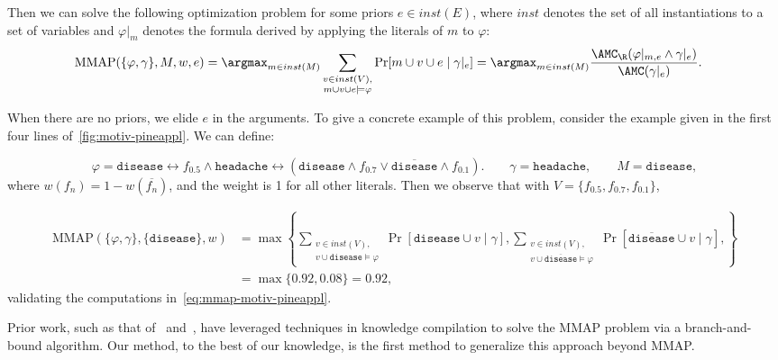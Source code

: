 Then we can solve the following optimization problem for some priors $e \in inst(E)$,
where $inst$ denotes the set of all instantiations to a set of variables and $\varphi|_m$
denotes the formula derived by applying the literals of $m$ to $\varphi$:
{\footnotesize
\begin{align}\label{eq:bbir-mmap}
  \mathrm{MMAP}{(\{\varphi, \gamma\}, M, w, e)}
  &= \argmax_{m \in inst(M)} \sum_{\substack{v \in inst(V), \\ m \cup v \cup e \models \varphi}}
  \Pr[m \cup v \cup e \mid \gamma|_e]
  = \argmax_{m \in inst(M)} \frac{\AMC_\R(\varphi|_{m,e} \land \gamma|_e)}{\AMC(\gamma|_e)}.
\end{align}
}

When there are no priors, we elide $e$ in the arguments.
To give a concrete example of this problem, consider the example
given in the first four lines of~\cref{fig:motiv-pineappl}.
We can define:

{\footnotesize
\begin{equation*}
  \varphi =  \texttt{disease} \leftrightarrow f_{0.5} \land
  \texttt{headache} \leftrightarrow (\texttt{disease} \land f_{0.7} \lor \overline{\texttt{disease}} \land f_{0.1}).
  \qquad
  \gamma = \texttt{headache},
  \qquad
  M = \texttt{disease},
\end{equation*}
}
where $w(f_{n}) = 1 - w(\overline{f_{n}})$,
and the weight is 1 for all other literals.
\noindent Then we observe that with $V = \{f_{0.5}, f_{0.7}, f_{0.1}\}$,

{\footnotesize
\begin{align*}
  \mathrm{MMAP}{(\{\varphi, \gamma\}, \{\texttt{disease}\},w)}
  &=\max \left\{
    \sum_{\substack{v \in inst(V), \\
    v \cup \texttt{disease} \models \varphi}} \Pr\left[\texttt{disease} \cup v \mid \gamma\right],
    \sum_{\substack{v \in inst(V), \\
    v \cup \overline{\texttt{disease}} \models \varphi}} \Pr\left[\overline{\texttt{disease}} \cup v \mid \gamma\right],
  \right\} \\
  &=\max\{0.92, 0.08\} = 0.92,
\end{align*}
}
validating the computations in~\cref{eq:mmap-motiv-pineappl}.

Prior work, such as that of~\citet{huang2006solving} and~\citet{lee2016exact},
have leveraged
techniques in knowledge compilation to solve the MMAP problem via
a branch-and-bound algorithm.
Our method, to the best of our knowledge,
is the first method to generalize this approach beyond MMAP.


